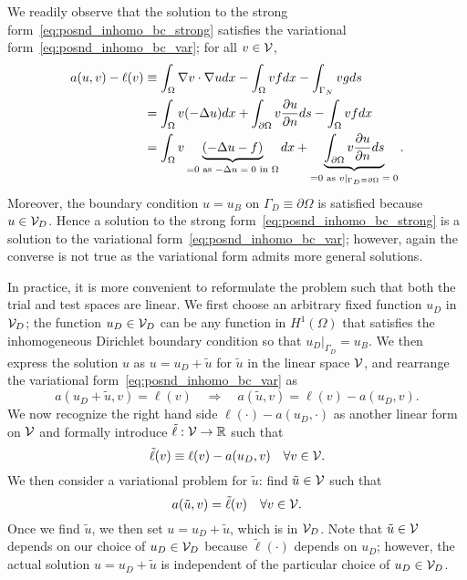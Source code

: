 We readily observe that the solution to the strong form~\eqref{eq:posnd_inhomo_bc_strong} satisfies the variational form~\eqref{eq:posnd_inhomo_bc_var};  for all $v \in \mathcal{V}$,
\begin{align*}
  a(u,v) - \ell(v)
  &\equiv \int_\Omega \nabla v \cdot \nabla u dx - \int_\Omega vf dx - \int_{\Gamma_N} vg ds
  \\
  &= \int_\Omega v (-\Delta u) dx + \int_{\partial \Omega} v \frac{\partial u}{\partial n} ds  - \int_\Omega vf dx 
  \\
  &= \int_\Omega v \underbrace{ (-\Delta u - f) }_{= 0 \text{ as $-\Delta u=  0$ in $\Omega$}} dx
  + \underbrace{ \int_{\partial \Omega} v \frac{\partial u}{\partial n} ds }_{= 0 \text{ as $v|_{\Gamma_D \equiv \partial \Omega} = 0$}}.
\end{align*}
Moreover, the boundary condition $u = u_B$ on $\Gamma_D \equiv \partial \Omega$ is satisfied because $u \in \mathcal{V}_D$. 
Hence a solution to the strong form~\eqref{eq:posnd_inhomo_bc_strong} is a solution to the variational form~\eqref{eq:posnd_inhomo_bc_var}; however, again the converse is not true as the variational form admits more general solutions.

In practice, it is more convenient to reformulate the problem such that both the trial and test spaces are linear.  We first choose an arbitrary fixed function $u_D$ in $\mathcal{V}_D$; the function $u_D \in \mathcal{V}_D$ can be any function in $H^1(\Omega)$ that satisfies the inhomogeneous Dirichlet boundary condition so that $u_D|_{\Gamma_D} = u_B$. We then express the solution $u$ as $u = u_D + \tilde u$ for $\tilde u$ in the linear space $\mathcal{V}$, and rearrange the variational form~\eqref{eq:posnd_inhomo_bc_var} as
\begin{equation*}
  a(u_D + \tilde u,v) = \ell(v) \quad \Rightarrow \quad
  a(\tilde u,v) = \ell(v) - a(u_D,v).
\end{equation*}
We now recognize the right hand side $\ell(\cdot) - a(u_D,\cdot)$ as another linear form on $\mathcal{V}$ and formally introduce $\tilde \ell: \mathcal{V} \to \mathbb{R}$ such that
\begin{equation*}
  \tilde \ell(v) \equiv \ell(v) - a(u_D,v) \quad \forall v \in \mathcal{V}.
\end{equation*}
We then consider a variational problem for $\tilde u$: find $\tilde u \in \mathcal{V}$ such that
\begin{equation}
  \label{eq:posnd_inhomo_bc_var_reform}
  a(\tilde u,v) = \tilde \ell(v) \quad \forall v \in \mathcal{V}.
\end{equation}
Once we find $\tilde u$, we then set $u = u_D + \tilde u$, which is in $\mathcal{V}_D$. Note that $\tilde u \in \mathcal{V}$ depends on our choice of $u_D \in \mathcal{V}_D$ because $\tilde \ell(\cdot)$ depends on $u_D$; however, the actual solution $u = u_D + \tilde u$ is independent of the particular choice of $u_D \in \mathcal{V}_D$.

